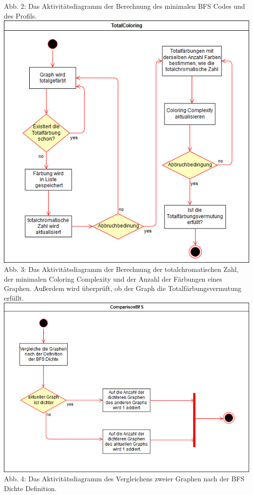 \documentclass[13pt]{scrreprt}
\begin{document}
\begin{center} Abb. 2: Das Aktivitätsdiagramm der Berechnung des minimalen BFS Codes und des Profils.
\includegraphics[scale = 0.75,center]{TotalColoring.jpg}
 Abb. 3: Das Aktivitätsdiagramm der Berechnung der totalchromatischen Zahl, der minimalen Coloring Complexity und der Anzahl der Färbungen eines Graphen. Außerdem wird überprüft, ob der Graph die Totalfärbungsvermutung erfüllt.
\includegraphics[scale = 0.75,center]{CompareBFS_Activity.jpg}
 Abb. 4: Das Aktivitätsdiagramm des Vergleichens zweier Graphen nach der BFS Dichte Definition.

\end{center}
\end{document}
